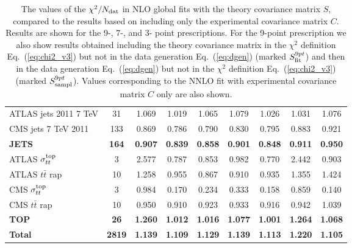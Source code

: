 \begin{table}[!p]
\begin{center}
\begin{tabular}{|l|c|c|ccc|cc|c|}
\midrule
ATLAS jets 2011 7 TeV                   &   31 & 1.069 & 1.019 & 1.065 & 1.079 & 1.026 & 1.031 & 1.076 \\
CMS jets 7 TeV 2011                     &  133 & 0.869 & 0.786 & 0.790 & 0.830 & 0.795 & 0.883 & 0.921 \\
\midrule
\bf JETS                                &  \bf 164 & \bf 0.907 & \bf 0.839 & \bf 0.858 & \bf 0.901 & \bf 0.848 & \bf 0.911 & \bf 0.950 \\
\midrule
ATLAS $\sigma_{tt}^{\rm top}$              &    3 & 2.577 & 0.787 & 0.853 & 0.982 & 0.770 & 2.442 & 0.903 \\
ATLAS $t\bar{t}$ rap                    &   10 & 1.258 & 0.955 & 0.867 & 0.910 & 0.935 & 1.355 & 1.424 \\
CMS $\sigma_{tt}^{\rm top}$                &    3 & 0.984 & 0.170 & 0.234 & 0.333 & 0.158 & 0.859 & 0.140 \\
CMS $t\bar{t}$ rap                      &   10 & 0.950 & 0.910 & 0.923 & 0.933 & 0.916 & 0.942 & 1.039 \\ 
\midrule
\bf TOP                                 &  \bf  26 & \bf 1.260 & \bf 1.012 & \bf 1.016 & \bf 1.077 & \bf 1.001 & \bf 1.264 & \bf 1.068 \\ 
\midrule
\bf Total                               & \bf 2819 & \bf 1.139 & \bf 1.109 & \bf 1.129 & \bf 1.139 & \bf 1.113 & \bf 1.220 & \bf 1.105 \\
\bottomrule
\end{tabular}
\end{center}
\caption{The values of the $\chi^2/N_{\rm dat}$ in NLO global fits
  with the theory covariance matrix $S$, compared to the results based on including only
  the experimental covariance matrix $C$. Results are shown
  for  the 9-, 7-, and 3- point prescriptions.
  For the 9-point prescription we also show results obtained
  including the theory covariance matrix in the $\chi^2$ 
  definition Eq.~(\ref{eq:chi2_v3}) but not
  in the data generation Eq.~(\ref{eq:dgen}) (marked $S_{\rm fit}^{9pt}$) 
  and then in the data generation Eq.~(\ref{eq:dgen}) but not in the $\chi^2$ 
  definition Eq.~(\ref{eq:chi2_v3}) (marked $S_{\rm sampl}^{9pt}$).
  Values corresponding to the
  NNLO fit with  experimental covariance matrix $C$ only are also shown.
  \label{table:chi2table_covth_global_nlo}
}
  \end{table}
